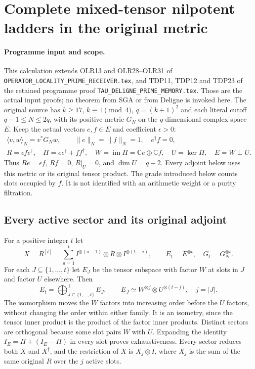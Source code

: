 \section{Complete mixed-tensor nilpotent ladders in the original metric}
\label{sec:mixed-tensor-nilpotent-ladders}

\paragraph{Programme input and scope.}
This calculation extends OLR13 and OLR28--OLR31 of
\nolinkurl{OPERATOR_LOCALITY_PRIME_RECEIVER.tex}, and TDP11,
TDP12 and TDP23 of the retained programme proof
\nolinkurl{TAU_DELiGNE_PRIME_MEMORY.tex}.
Those are the actual input proofs; no theorem from SGA or from
Deligne is invoked here. The original source has
$k\ge17$, $k\equiv1\pmod4$, $q=(k+1)^2$ and each literal cutoff
$q-1\le N\le2q$, with its positive metric $G_N$ on the
$q$-dimensional complex space $E$.
Keep the actual vectors $e,f\in E$ and coefficient $\epsilon>0$:
\[
\begin{gathered}
\langle v,w\rangle_N=v^*G_Nw,\qquad
\|e\|_N=\|f\|_N=1,\quad e^\dagger f=0,\\
R=\epsilon fe^\dagger,\quad
\Pi=ee^\dagger+ff^\dagger,\quad
W=\operatorname{im}\Pi=\mathbb Ce\oplus\mathbb Cf,\quad
U=\ker\Pi,\quad E=W\mathbin\perp U.
\end{gathered}
\tag{OLM1}
\]
Thus $Re=\epsilon f$, $Rf=0$, $R|_U=0$, and $\dim U=q-2$.
Every adjoint below uses this metric or its original tensor product.
The grade introduced below counts slots occupied by $f$. It is
not identified with an arithmetic weight or a purity filtration.

\subsection{Every active sector and its original adjoint}

For a positive integer $t$ let
\[
X=R^{[t]}=\sum_{a=1}^t I^{\otimes(a-1)}\otimes R
                         \otimes I^{\otimes(t-a)},
\qquad E_t=E^{\otimes t},\quad G_t=G_N^{\otimes t}.
\tag{OLM2}
\]
For each $J\subseteq\{1,\ldots,t\}$ let $E_J$ be the tensor
subspace with factor $W$ at slots in $J$ and factor $U$ elsewhere.
Then
\[
E_t=\mathop{\bigoplus}_{J\subseteq\{1,\ldots,t\}}^{\perp}E_J,
\qquad
E_J\simeq W^{\otimes j}\otimes U^{\otimes(t-j)},
\quad j=|J|.
\tag{OLM3}
\]
The isomorphism moves the $W$ factors into increasing order before
the $U$ factors, without changing the order within either family.
It is an isometry, since the tensor inner product is the product
of the factor inner products. Distinct sectors are orthogonal
because some slot pairs $W$ with $U$. Expanding the identity
$I_E=\Pi+(I_E-\Pi)$ in every slot proves exhaustiveness.
Every sector reduces both $X$ and $X^\dagger$, and the restriction
of $X$ is $X_j\otimes I$, where $X_j$ is the sum of the same
original $R$ over the $j$ active slots.

